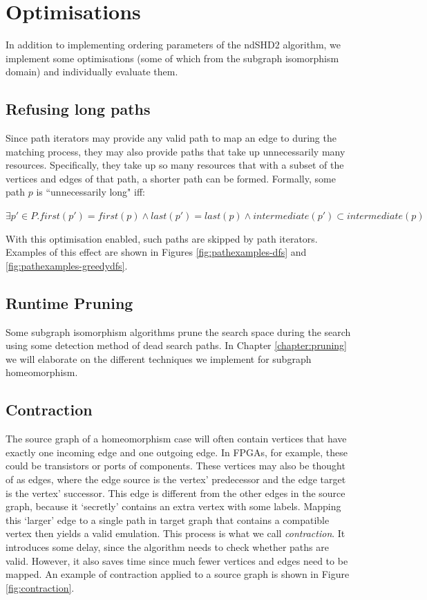 \section{Optimisations}
In addition to implementing ordering parameters of the ndSHD2 algorithm, we implement some optimisations (some of which from the subgraph isomorphism domain) and individually evaluate them.

\subsection{Refusing long paths}
Since path iterators may provide any valid path to map an edge to during the matching process, they may also provide paths that take up unnecessarily many resources. Specifically, they take up so many resources that with a subset of the vertices and edges of that path, a shorter path can be formed. Formally, some path $p$ is ``unnecessarily long" iff:


$\exists p' \in P . first(p') = first(p) \land last(p') = last(p) \land intermediate(p') \subset intermediate(p)$

With this optimisation enabled, such paths are skipped by path iterators. Examples of this effect are shown in Figures \ref{fig:pathexamples-dfs} and \ref{fig:pathexamples-greedydfs}.

\subsection{Runtime Pruning}
Some subgraph isomorphism algorithms\cite{Cordella2004, McCreesh2015} prune the search space during the search using some detection method of dead search paths. In Chapter \ref{chapter:pruning} we will elaborate on the different techniques we implement for subgraph homeomorphism.

\subsection{Contraction}
The source graph of a homeomorphism case will often contain vertices that have exactly one incoming edge and one outgoing edge. In FPGAs, for example, these could be transistors or ports of components. These vertices may also be thought of as edges, where the edge source is the vertex' predecessor and the edge target is the vertex' successor. This edge is different from the other edges in the source graph, because it `secretly' contains an extra vertex with some labels. Mapping this `larger' edge to a single path in target graph that contains a compatible vertex then yields a valid emulation. This process is what we call \textit{contraction}. It introduces some delay, since the algorithm needs to check whether paths are valid. However, it also saves time since much fewer vertices and edges need to be mapped. An example of contraction applied to a source graph is shown in Figure \ref{fig:contraction}.



